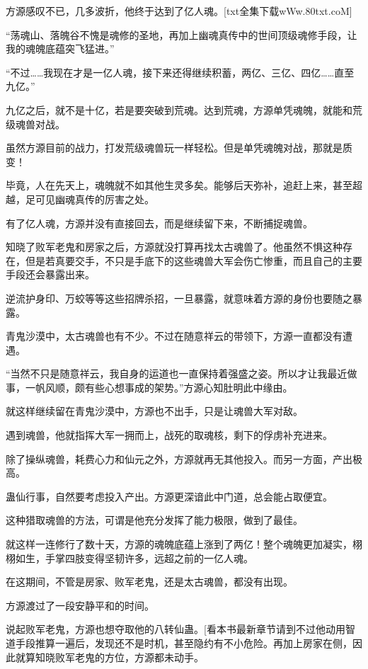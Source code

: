 
\begin{this_body}

方源感叹不已，几多波折，他终于达到了亿人魂。[txt全集下载wWw.80txt.coM]

“荡魂山、落魄谷不愧是魂修的圣地，再加上幽魂真传中的世间顶级魂修手段，让我的魂魄底蕴突飞猛进。”

“不过……我现在才是一亿人魂，接下来还得继续积蓄，两亿、三亿、四亿……直至九亿。”

九亿之后，就不是十亿，若是要突破到荒魂。达到荒魂，方源单凭魂魄，就能和荒级魂兽对战。

虽然方源目前的战力，打发荒级魂兽玩一样轻松。但是单凭魂魄对战，那就是质变！

毕竟，人在先天上，魂魄就不如其他生灵多矣。能够后天弥补，追赶上来，甚至超越，足可见幽魂真传的厉害之处。

有了亿人魂，方源并没有直接回去，而是继续留下来，不断捕捉魂兽。

知晓了败军老鬼和房家之后，方源就没打算再找太古魂兽了。他虽然不惧这种存在，但是若真要交手，不只是手底下的这些魂兽大军会伤亡惨重，而且自己的主要手段还会暴露出来。

逆流护身印、万蛟等等这些招牌杀招，一旦暴露，就意味着方源的身份也要随之暴露。

青鬼沙漠中，太古魂兽也有不少。不过在随意祥云的带领下，方源一直都没有遭遇。

“当然不只是随意祥云，我自身的运道也一直保持着强盛之姿。所以才让我最近做事，一帆风顺，颇有些心想事成的架势。”方源心知肚明此中缘由。

就这样继续留在青鬼沙漠中，方源也不出手，只是让魂兽大军对敌。

遇到魂兽，他就指挥大军一拥而上，战死的取魂核，剩下的俘虏补充进来。

除了操纵魂兽，耗费心力和仙元之外，方源就再无其他投入。而另一方面，产出极高。

蛊仙行事，自然要考虑投入产出。方源更深谙此中门道，总会能占取便宜。

这种猎取魂兽的方法，可谓是他充分发挥了能力极限，做到了最佳。

就这样一连修行了数十天，方源的魂魄底蕴上涨到了两亿！整个魂魄更加凝实，栩栩如生，手掌四肢变得坚韧许多，远超之前的一亿人魂。

在这期间，不管是房家、败军老鬼，还是太古魂兽，都没有出现。

方源渡过了一段安静平和的时间。

说起败军老鬼，方源也想夺取他的八转仙蛊。[看本书最新章节请到不过他动用智道手段推算一遍后，发现还不是时机，甚至隐约有不小危险。再加上房家在侧，因此就算知晓败军老鬼的方位，方源都未动手。


\end{this_body}
